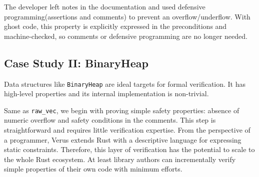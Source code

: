 \documentclass[conference]{IEEEtran}
\begin{document}
The developer left notes in the documentation and used defensive programming(assertions and comments) to prevent an overflow/underflow. With ghost code, this property is explicitly expressed in the preconditions and machine-checked, so comments or defensive programming are no longer needed. 

\subsection{Case Study II: BinaryHeap}
Data structures like \texttt{BinaryHeap} are ideal targets for formal verification. It has high-level properties and its internal implementation is non-trivial. 

Same as \texttt{raw\_vec}, we begin with proving simple safety properties: absence of numeric overflow and safety conditions in the comments. This step is straightforward and requires little verification expertise. From the perspective of a programmer, Verus extends Rust with a descriptive language for expressing static constraints. Therefore, this layer of verification has the potential to scale to the whole Rust ecosystem. At least library authors can incrementally verify simple properties of their own code with minimum efforts.     
\end{document}
